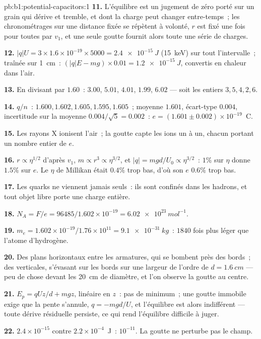 \begin{solution}{pb:b1:potential-capacitors:1}
\textbf{11.} L'équilibre est un jugement de zéro porté sur un grain qui dérive
et tremble, et dont la charge peut changer entre-temps~; les chronométrages sur
une distance fixée se répètent à volonté, $r$ est fixé une fois pour toutes par
$v_1$, et une seule goutte fournit alors toute une série de charges.

\textbf{12.} $|q|U = 3 \times 1.6 \times 10^{-19} \times 5000 = \qty{2.4e-15}{J}$
(\qty{15}{keV}) sur tout l'intervalle~; traînée sur \qty{1}{cm}~: $(|q|E - mg) \times 0.01 =
\qty{1.2e-15}{J}$, convertis en chaleur dans l'air.

\textbf{13.} En divisant par $1.60$~: $3.00$, $5.01$, $4.01$, $1.99$, $6.02$ ---
soit les entiers $3, 5, 4, 2, 6$.

\textbf{14.} $q/n$~: $1.600, 1.602, 1.605, 1.595, 1.605$~; moyenne $1.601$,
écart-type $0.004$, incertitude sur la moyenne $0.004/\sqrt5 =
0.002$~: $e = (1.601 \pm 0.002) \times 10^{-19}$~C.

\textbf{15.} Les rayons X ionisent l'air~; la goutte capte les ions un à un,
chacun portant un nombre entier de $e$.

\textbf{16.} $r \propto \eta^{1/2}$ d'après $v_1$, $m \propto r^3 \propto \eta^{3/2}$, et
$|q| = mgd/U_0 \propto \eta^{3/2}$~: $1\%$ sur $\eta$ donne $1.5\%$ sur $e$. Le
$\eta$ de Millikan était $0.4\%$ trop bas, d'où son $e$ $0.6\%$ trop bas.

\textbf{17.} Les quarks ne viennent jamais seuls~: ils sont confinés dans les
hadrons, et tout objet libre porte une charge entière.

\textbf{18.} $N_A = F/e = 96485/1.602 \times 10^{-19} = \qty{6.02e23}{mol^{-1}}$.

\textbf{19.} $m_e = 1.602 \times 10^{-19}/1.76 \times 10^{11} = \qty{9.1e-31}{kg}$~: $1840$
fois plus léger que l'atome d'hydrogène.

\textbf{20.} Des plans horizontaux entre les armatures, qui se bombent près des
bords~; des  verticales, s'évasant sur les bords sur une largeur
de l'ordre de $d = \qty{1.6}{cm}$ --- peu de chose devant les \qty{20}{cm} de
diamètre, et l'on observe la goutte au centre.

\textbf{21.} $E_p = qUz/d + mgz$, linéaire en $z$~: pas de minimum~; une goutte
immobile exige que la pente s'annule, $q = -mgd/U$, et l'équilibre est alors
indifférent --- toute dérive résiduelle persiste, ce qui rend l'équilibre
difficile à juger.

\textbf{22.} $2.4 \times 10^{-15}$ contre $2.2 \times 10^{-4}$~J~: $10^{-11}$. La goutte
ne perturbe pas le champ.


\end{solution}
